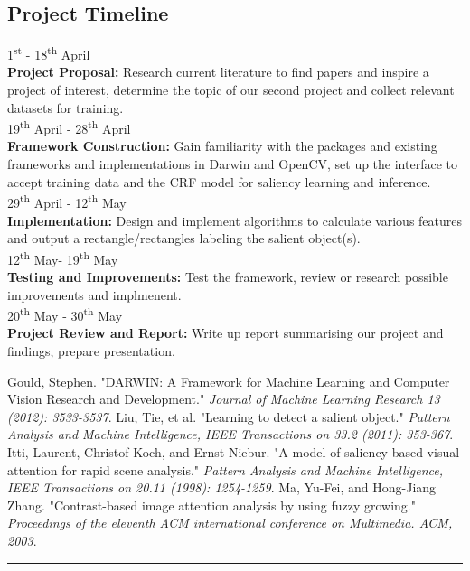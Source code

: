 \documentclass[12pt,a4paper]{article}
\newcommand{\BOLD}{\textbf}
\newcommand{\Hrule}{\textcolor{blue}{\rule{\linewidth}{0.5mm}}}
\newcommand{\SUPER}{\textsuperscript}
\newcommand{\TIMELINE}[3]{#1\\\BOLD{#2} #3}
\newcommand{\TIMELINESPACE}{\\[0.3cm]}
\begin{document}
\begin{multicols}{2}
\section{Project Timeline}
\TIMELINE{1\SUPER{st}  - 18\SUPER{th} April}{Project Proposal:}{Research current literature to find papers and inspire a project of interest, determine the topic of our second project and collect relevant datasets for training.}\TIMELINESPACE
%
\TIMELINE{19\SUPER{th} April - 28\SUPER{th} April}{Framework Construction:}{Gain familiarity with the packages and existing frameworks and implementations in Darwin and OpenCV, set up the interface to accept training data and the CRF model for saliency learning and inference.} \TIMELINESPACE
%
\TIMELINE{29\SUPER{th} April - 12\SUPER{th} May}{Implementation:}{Design and implement algorithms to calculate various features and output a rectangle/rectangles labeling the salient object(s).}\TIMELINESPACE
%
\TIMELINE{12\SUPER{th} May- 19\SUPER{th} May}{Testing and Improvements:}{Test the framework, review or research possible improvements and implmenent.}\TIMELINESPACE
%
\TIMELINE{20\SUPER{th} May - 30\SUPER{th} May}{Project Review and Report:}{Write up report summarising our project and findings, prepare presentation.}
\begin{thebibliography}{8} \footnotesize
     Gould, Stephen. "DARWIN: A Framework for Machine Learning and Computer Vision Research and Development." \textit{Journal of Machine Learning Research 13 (2012): 3533-3537}. 
     Liu, Tie, et al. "Learning to detect a salient object." \textit{Pattern Analysis and Machine Intelligence, IEEE Transactions on 33.2 (2011): 353-367}. 
     Itti, Laurent, Christof Koch, and Ernst Niebur. "A model of saliency-based visual attention for rapid scene analysis."\textit{ Pattern Analysis and Machine Intelligence, IEEE Transactions on 20.11 (1998): 1254-1259}.
     Ma, Yu-Fei, and Hong-Jiang Zhang. "Contrast-based image attention analysis by using fuzzy growing."\textit{ Proceedings of the eleventh ACM international conference on Multimedia. ACM, 2003}. 
\end{thebibliography}
\end{multicols}
\vfill\Hrule
\end{document}
